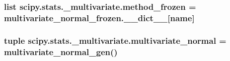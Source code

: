 \subsubsection[{method\+\_\+frozen}]{\setlength{\rightskip}{0pt plus 5cm}list scipy.\+stats.\+\_\+multivariate.\+method\+\_\+frozen = multivariate\+\_\+normal\+\_\+frozen.\+\_\+\+\_\+dict\+\_\+\+\_\+\mbox{[}name\mbox{]}}\label{namespacescipy_1_1stats_1_1__multivariate_a0960680809ec621835afefb2c3742e7f}
\hypertarget{namespacescipy_1_1stats_1_1__multivariate_a60ba45824bae768ca43850150353602d}{}
\subsubsection[{multivariate\+\_\+normal}]{\setlength{\rightskip}{0pt plus 5cm}tuple scipy.\+stats.\+\_\+multivariate.\+multivariate\+\_\+normal = {\bf multivariate\+\_\+normal\+\_\+gen}()}\label{namespacescipy_1_1stats_1_1__multivariate_a60ba45824bae768ca43850150353602d}
